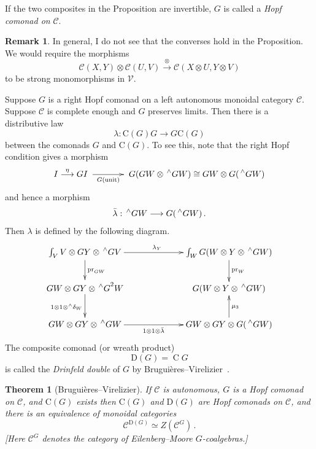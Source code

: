 \documentclass[a4paper,12pt]{article}
\newtheorem*{Theorem}{Theorem}%
\theoremstyle{definition}
\newtheorem*{Remark}{Remark}%
\theoremstyle{fact}
\theoremstyle{genquest}
\theoremstyle{step}
\newcommand{\catC}{\mathcal{C}}
\newcommand{\funcC}{\mathrm{C}}
\newcommand{\Drin}{\mathrm{D}}
\newcommand{\catV}{\mathcal{V}}
\newcommand{\pr}{\operatorname{pr}^{}}
\newcommand{\longto}{\longrightarrow}
\newcommand{\ldual}[1]{\mathord{{\let\nolimits\relax\sideset{^\wedge}{}{#1}}}}
\begin{document}
\noindent
If the two composites in the Proposition are invertible, $G$ is called a \emph{Hopf comonad on} $\catC$. 

\begin{Remark} 
In general, I do not see that the converses hold in the Proposition.  We would require the morphisms
\[
\catC (X,Y) \otimes \catC (U,V) \stackrel{\otimes}{\longto} \catC (X \otimes U, Y \otimes V)
\]
to be strong monomorphisms in $\catV$.
\end{Remark} 

Suppose $G$ is a right Hopf comonad on a left autonomous monoidal category $\catC$.  
Suppose $\catC$ is complete enough and $G$ preserves limits.   
Then there is a distributive law
\[
\lambda : \funcC (G) G \longto G \funcC (G)
\]
between the comonads $G$ and $\funcC (G)$.  
To see this, note that the right Hopf condition gives a morphism
\[
I \stackrel{\eta}{\longto} GI \xymatrix@C+12pt { \ar[r]_{G (\text{unit})} & }
 G (GW \otimes \ldual{G}W) \cong GW \otimes G (\ldual{G}W)
\]
and hence a morphism
\[
\bar \lambda : \ldual{G}W \longto G(\ldual{G}W)\,.
\]
Then $\lambda$ is defined by the following diagram.
\[
\xymatrix @C+1.5cm {
 \int_V V \otimes GY \otimes \ldual{G}V \ar[r]^{\lambda_Y} \ar[d]^{\pr_{GW}} 
  &  \int_W G (W\otimes Y \otimes \ldual{G}W) \ar[d]^{\pr_W}
\\
GW \otimes GY \otimes \ldual{G}^2W \ar[d]_{1\otimes 1 \otimes {}^{\wedge}\delta_W} 
 & G(W\otimes Y \otimes \ldual{G}W) 
\\
GW\otimes GY \otimes \ldual{G}W \ar[r]_-{1\otimes 1 \otimes \bar \lambda}  
 &  GW \otimes GY \otimes G (\ldual{G}W) \ar[u]_{\mu_3} 
}
\]
The composite comonad (or wreath product)
\[
\Drin (G) = \mathop{\funcC (G)} G
\]
is called the \emph{Drinfeld double} of $G$ by Brugui\`eres--Virelizier~\cite{BrugVirel2008}.


\begin{Theorem} [Brugui\`eres--Virelizier]
If $\catC$ is autonomous, 
$G$ is a Hopf comonad on $\catC$, and $\funcC(G)$ exists 
then $\funcC(G)$ and $\Drin(G)$ are Hopf comonads on $\catC$, and there is an equivalence of monoidal categories
\[
\catC^{\Drin (G)}  \simeq Z (\catC^G)\,.
\]
{\upshape [}Here $\catC^G$ denotes the category of Eilenberg--Moore $G$-coalgebras.{\upshape ]}
\end{Theorem}
\end{document}
